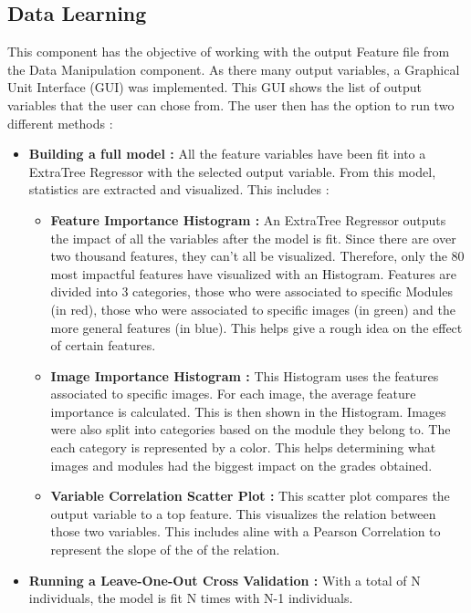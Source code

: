 \documentclass[a4paper,11pt]{report}
\numberwithin{figure}{chapter} %
\begin{document}
    \subsection{Data Learning}

    This component has the objective of working with the output Feature file from the Data Manipulation component.
    As there many output variables, a Graphical Unit Interface (GUI) was implemented.
    This GUI shows the list of output variables that the user can chose from.
    The user then has the option to run two different methods :
    \begin{itemize}
        \item[\textbullet] \textbf{Building a full model :} All the feature variables have been fit into a ExtraTree Regressor with the selected output variable.
        From this model, statistics are extracted and visualized.
        This includes :
        \begin{itemize}
            \item \textbf{Feature Importance Histogram :} An ExtraTree Regressor outputs the impact of all the variables after the model is fit.
            Since there are over two thousand features, they can't all be visualized.
            Therefore, only the 80 most impactful features have visualized with an Histogram.
            Features are divided into 3 categories, those who were associated to specific Modules (in red), those who were associated to specific images (in green) and the more general features (in blue).
            This helps give a rough idea on the effect of certain features.
            \item \textbf{Image Importance Histogram :} This Histogram uses the features associated to specific images.
            For each image, the average feature importance is calculated.
            This is then shown in the Histogram.
            Images were also split into categories based on the module they belong to.
            The each category is represented by a color.
            This helps determining what images and modules had the biggest impact on the grades obtained.
            \item \textbf{Variable Correlation Scatter Plot :} This scatter plot compares the output variable to a top feature.
            This visualizes the relation between those two variables.
            This includes aline with a Pearson Correlation to represent the slope of the of the relation.
        \end{itemize}
        \item \textbf{Running a Leave-One-Out Cross Validation :} With a total of N individuals, the model is fit N times with N-1 individuals.

\end{itemize}
\end{document}
